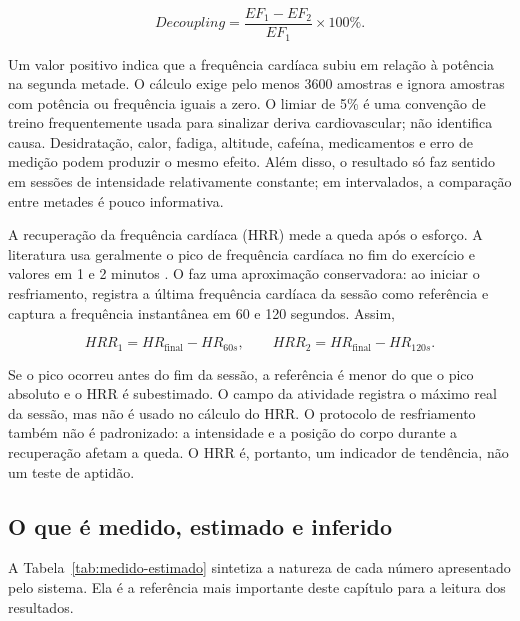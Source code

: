 \begin{equation}\label{eq:decoupling}
Decoupling = \frac{EF_1 - EF_2}{EF_1} \times 100\%.
\end{equation}

\noindent Um valor positivo indica que a frequência cardíaca subiu em relação à
potência na segunda metade. O cálculo exige pelo menos 3600 amostras e ignora
amostras com potência ou frequência iguais a zero. O limiar de 5\% é uma
convenção de treino frequentemente usada para sinalizar deriva
cardiovascular; não identifica causa. Desidratação, calor, fadiga, altitude,
cafeína, medicamentos e erro de medição podem produzir o mesmo efeito. Além
disso, o resultado só faz sentido em sessões de intensidade relativamente
constante; em intervalados, a comparação entre metades é pouco informativa.

A recuperação da frequência cardíaca (HRR) mede a queda após o esforço. A
literatura usa geralmente o pico de frequência cardíaca no fim do exercício e
valores em 1 e 2 minutos \cite{cole1999,lamberts2009}. O \argus{} faz uma
aproximação conservadora: ao iniciar o resfriamento, registra a última
frequência cardíaca da sessão como referência e captura a frequência
instantânea em 60 e 120 segundos. Assim,

\begin{equation}\label{eq:hrr}
HRR_1 = HR_{\text{final}} - HR_{60s},
\qquad
HRR_2 = HR_{\text{final}} - HR_{120s}.
\end{equation}

\noindent Se o pico ocorreu antes do fim da sessão, a referência é menor do que
o pico absoluto e o HRR é subestimado. O campo  da atividade
registra o máximo real da sessão, mas não é usado no cálculo do HRR. O
protocolo de resfriamento também não é padronizado: a intensidade e a posição
do corpo durante a recuperação afetam a queda. O HRR é, portanto, um indicador
de tendência, não um teste de aptidão.

\subsection{O que é medido, estimado e inferido}
\label{sec:medido-estimado}

A Tabela~\ref{tab:medido-estimado} sintetiza a natureza de cada número
apresentado pelo sistema. Ela é a referência mais importante deste capítulo
para a leitura dos resultados.


